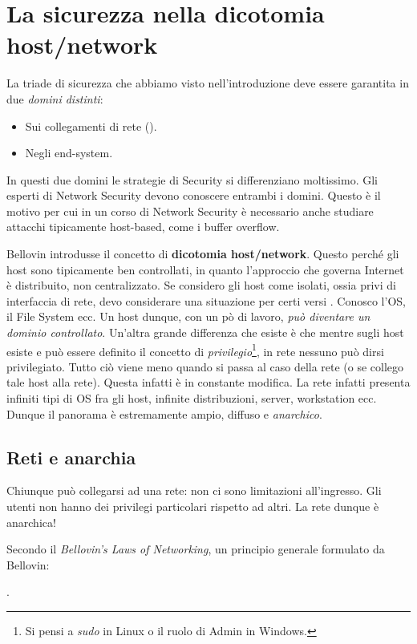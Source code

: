 \documentclass[14pt]{extreport}
\begin{document}
\section{La sicurezza nella dicotomia host/network}
La triade di sicurezza che abbiamo visto nell'introduzione deve essere garantita in due \textit{domini distinti}:

\begin{itemize}
    \item Sui collegamenti di rete ().
    \item Negli end-system.
\end{itemize}

In questi due domini le strategie di Security si differenziano moltissimo. Gli esperti di Network Security devono conoscere entrambi i domini. Questo è il motivo per cui in un corso di Network Security è necessario anche studiare attacchi tipicamente host-based, come i buffer overflow.

Bellovin introdusse il concetto di \textbf{dicotomia host/network}. Questo perché gli host sono tipicamente ben controllati, in quanto l'approccio che governa Internet è distribuito, non centralizzato. Se considero gli host come isolati, ossia privi di interfaccia di rete, devo considerare una situazione per certi versi . Conosco l'OS, il File System ecc.
Un host dunque, con un pò di lavoro, \textit{può diventare un dominio controllato}.
Un'altra grande differenza che esiste è che mentre sugli host esiste e può essere definito il concetto di \textit{privilegio}\footnote{Si pensi a \textit{sudo} in Linux o il ruolo di Admin in Windows.}, in rete nessuno può dirsi privilegiato.
Tutto ciò viene meno quando si passa al caso della rete (o se collego tale host alla rete). Questa infatti è in constante modifica. La rete infatti presenta infiniti tipi di OS fra gli host, infinite distribuzioni, server, workstation ecc. Dunque il panorama è estremamente ampio, diffuso e \textit{anarchico}.

\subsection{Reti e anarchia}
Chiunque può collegarsi ad una rete: non ci sono limitazioni all'ingresso. Gli utenti non hanno dei privilegi particolari rispetto ad altri. La rete dunque è anarchica!


Secondo il \textit{Bellovin's Laws of Networking}, un principio generale formulato da Bellovin:


\begin{center}
\textit{}.
\end{center}
\end{document}
